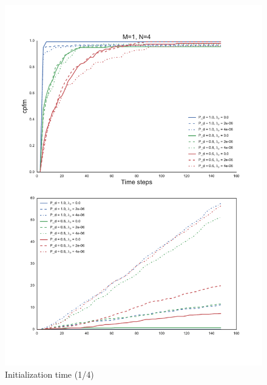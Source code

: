 {\begin{figure}
\centering
\includegraphics[height = .9\textheight]{Figures/plots/Scenario1_Init-Time(1-4).pdf}
\caption{Initialization time (1/4)}\label{fig:init_time_1-4}
\end{figure}

}
